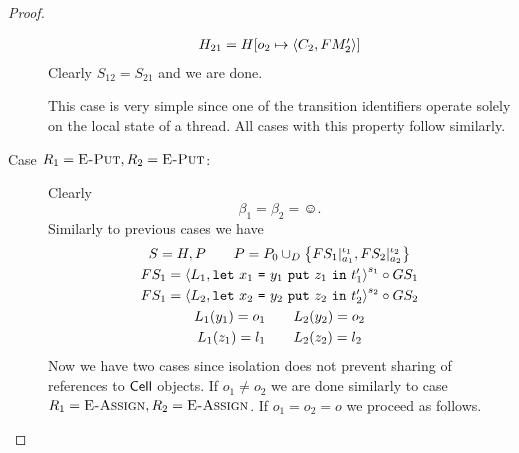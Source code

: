 \begin{proof}
\begin{description}
\begin{equation}
\begin{gathered}
          H_{21} = H[o_2 \mapsto \mbox{$\langle C_2, FM'_2 \rangle$}]
        \end{gathered}
      \end{equation}
      Clearly $S_{12} = S_{21}$ and we are done.
      \begin{remark}
        This case is very simple since one of the transition identifiers
        operate solely on the local state of a thread. All cases with this
        property follow similarly.
      \end{remark}
    \item[Case $R_1 = \mbox{{\sc E-Put}}, R_2 = \mbox{{\sc E-Put}}$:] Clearly
      \begin{equation*}
        \beta_1 = \beta_2 = \smiley.
      \end{equation*}
      Similarly to previous cases we have
      \begin{equation}
        \begin{gathered}
          S = H, P \quad\quad P = P_0 \cup_D \left\{ FS_1|_{a_1}^{\iota_1},
          FS_2|_{a_2}^{\iota_2} \right\} \\
          FS_1 = \mbox{$\langle L_1, \mbox{\mdseries\texttt{let}~$x_1$~\texttt{=}~$\mbox{\mdseries$y_1$~\texttt{put}~$z_1$}$~\texttt{in}~$t'_1$} \rangle$}^{s_1} \circ GS_1
          \\ 
          FS_1 = \mbox{$\langle L_2, \mbox{\mdseries\texttt{let}~$x_2$~\texttt{=}~$\mbox{\mdseries$y_2$~\texttt{put}~$z_2$}$~\texttt{in}~$t'_2$} \rangle$}^{s_2}
          \circ GS_2 \\
          L_1(y_1) = o_1 \quad\quad L_2(y_2) = o_2 \\
          L_1(z_1) = l_1 \quad\quad L_2(z_2) = l_2
        \end{gathered}
      \end{equation}
      Now we have two cases since isolation does not prevent sharing of
      references to $\mbox{$\mathsf{Cell}$}$ objects. If $o_1 \neq o_2$ we are done similarly
      to case $R_1 = \mbox{{\sc E-Assign}}, R_2 = \mbox{{\sc E-Assign}}$. If $o_1 = o_2 = o$ we proceed as
      follows.
      

\end{description}
\end{proof}
